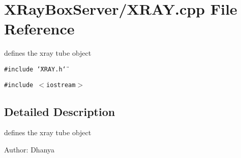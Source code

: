 \section{XRay\-Box\-Server/XRAY.cpp File Reference}
\label{XRAY_8cpp}
defines the xray tube object 

{\tt \#include \char`\"{}XRAY.h\char`\"{}}\par
{\tt \#include $<$iostream$>$}\par


\subsection{Detailed Description}
defines the xray tube object 

\begin{Desc}
\item[Author:]Dhanya \end{Desc}
